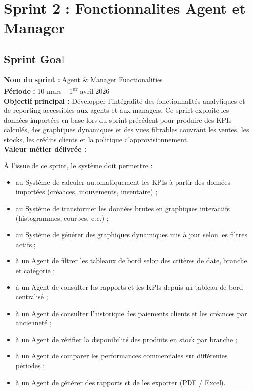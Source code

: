 \documentclass[a4paper,12pt]{report}
\begin{document}
\section{Sprint 2 : Fonctionnalites Agent et Manager}
 
\subsection{Sprint Goal}
 
\textbf{Nom du sprint :} Agent \& Manager Functionalities \\
\textbf{Période :} 10 mars -- 1\textsuperscript{er} avril 2026 \\[4pt]
\textbf{Objectif principal :}
Développer l'intégralité des fonctionnalités analytiques et de reporting
accessibles aux agents et aux managers. Ce sprint exploite les données
importées en base lors du sprint précédent pour produire des KPIs
calculés, des graphiques dynamiques et des vues filtrables couvrant les
ventes, les stocks, les crédits clients et la politique
d'approvisionnement. \\[4pt]
\textbf{Valeur métier délivrée :}
 
À l'issue de ce sprint, le système doit permettre :
\begin{itemize}
    \item au Système de calculer automatiquement les KPIs à partir des
    données importées (créances, mouvements, inventaire) ;
    \item au Système de transformer les données brutes en graphiques
    interactifs (histogrammes, courbes, etc.) ;
    \item au Système de générer des graphiques dynamiques mis à jour selon
    les filtres actifs ;
    \item à un Agent de filtrer les tableaux de bord selon des critères de
    date, branche et catégorie ;
    \item à un Agent de consulter les rapports et les KPIs depuis un
    tableau de bord centralisé ;
    \item à un Agent de consulter l'historique des paiements clients et
    les créances par ancienneté ;
    \item à un Agent de vérifier la disponibilité des produits en stock
    par branche ;
    \item à un Agent de comparer les performances commerciales sur
    différentes périodes ;
    \item à un Agent de générer des rapports et de les exporter (PDF / Excel).
\end{itemize}
 
\end{document}
